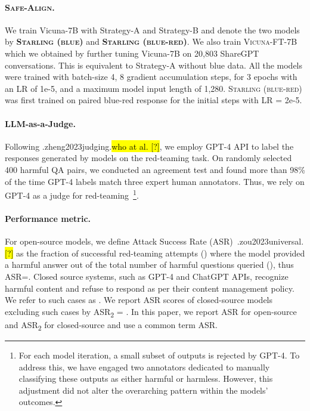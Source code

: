 \documentclass{article}
\newcommand{\starlingemoji}{\textsc{Starling}}
\newcommand{\alignment}{\textsc{Safe-Align}}
\let\realcite\cite
\renewcommand{\cite}[1]{\ifx.#1.\hl{[?]}\else\realcite{#1}\fi}
\let\realcitet\citet
\renewcommand{\citet}[1]{\ifx.#1.\hl{who at al. [?]}\else\realcitet{#1}\fi}
\begin{document}
{\paragraph{\alignment{}.}
We train Vicuna-7B with Strategy-A and Strategy-B and denote the two models by \textbf{\starlingemoji{} \textsc{(blue)}} and \textbf{\starlingemoji{} \textsc{(blue-red)}}. We also train \textsc{Vicuna-FT-7B} which we obtained by further tuning Vicuna-7B on 20,803 ShareGPT conversations. This is equivalent to Strategy-A without blue data. All the models were trained with batch-size 4, 8 gradient accumulation steps, for 3 epochs with an LR of 1e-5, and a maximum model input length of 1,280. \starlingemoji{} \textsc{(blue-red)} was first trained on paired blue-red response for the initial  steps with LR = 2e-5.

\paragraph{LLM-as-a-Judge.}
Following \citet{zheng2023judging}, we employ GPT-4 API to label the responses generated by models on the red-teaming task. On randomly selected 400 harmful QA pairs, we conducted an agreement test and found more than 98\% of the time GPT-4 labels match three expert human annotators. Thus, we rely on GPT-4 as a judge for red-teaming~\footnote{For each model iteration, a small subset of outputs is rejected by GPT-4. To address this, we have engaged two annotators dedicated to manually classifying these outputs as either harmful or harmless. However, this adjustment did not alter the overarching pattern within the models' outcomes.}.

\paragraph{Performance metric.} For open-source models, we define  Attack Success Rate (ASR)~\cite{zou2023universal} as the fraction of successful red-teaming attempts () where the model provided a harmful answer out of the total number of harmful questions queried (), thus ASR=. Closed source systems, such as GPT-4 and ChatGPT APIs, recognize harmful content and refuse to respond as per their content management policy. We refer to such cases as . We report ASR scores of closed-source models excluding such cases by ASR\textsubscript{2} = . In this paper, we report ASR for open-source and ASR\textsubscript{2} for closed-source and use a common term ASR.

}
\end{document}
